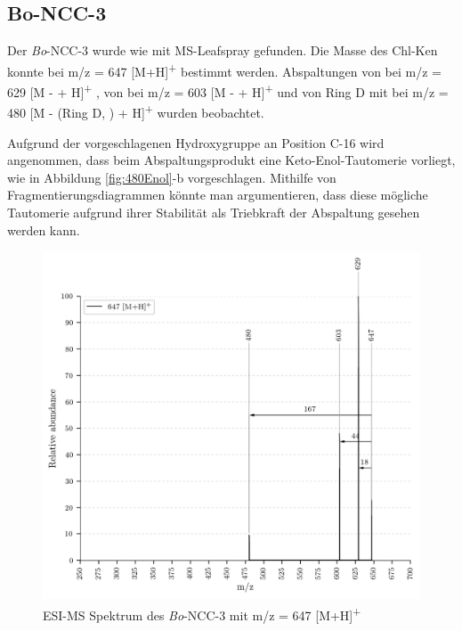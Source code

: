 \pagebreak
\subsection{Bo-NCC-3} \label{sec:ESIMSBoNCC3}

Der \textit{Bo}-NCC-3 wurde wie mit MS-Leafspray gefunden. Die Masse des \gls{Chl-K}en konnte bei m/z = 647 [M+H]\textsuperscript{+} bestimmt werden. Abspaltungen von  bei m/z = 629 [M -  + H]\textsuperscript{+} , von  bei m/z = 603 [M -  + H]\textsuperscript{+} und von Ring D mit  bei m/z = 480 [M - (Ring D, ) + H]\textsuperscript{+} wurden beobachtet. 

Aufgrund der vorgeschlagenen Hydroxygruppe an Position C-16 wird angenommen, dass beim Abspaltungsprodukt eine Keto-Enol-Tautomerie vorliegt, wie in Abbildung \ref{fig:480Enol}-b vorgeschlagen. Mithilfe von Fragmentierungsdiagrammen könnte man argumentieren, dass diese mögliche Tautomerie aufgrund ihrer Stabilität als Triebkraft der Abspaltung gesehen werden kann.

\begin{figure}[!htbp]
  \centering
  \includegraphics[width=\textwidth, height=0.6\textwidth]{figures/Kapitel7/Kataboliten/VWA_MS_647.png}
  \caption[ESI-MS Spektrum des \textit{Bo}-NCC-3, Quelle: Autor]{ESI-MS Spektrum des \textit{Bo}-NCC-3 mit m/z = 647 [M+H]\textsuperscript{+}}
  \label{fig:647MH}
\end{figure}

